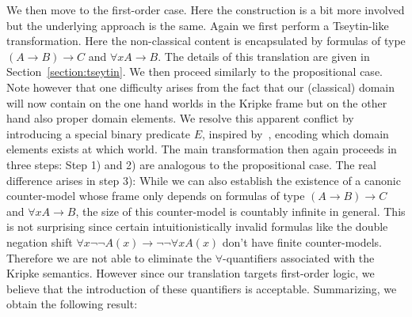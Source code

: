 \documentclass[runningheads]{llncs}
\begin{document}

We then move to the first-order case. Here the construction is a bit more involved but the underlying approach is the same.
Again we first perform a Tseytin-like transformation.
Here the non-classical content is encapsulated by formulas of type $(A\to B)\to C$ and $\forall xA\to B$.
The details of this translation are given in Section~\ref{section:tseytin}.
We then proceed similarly to the propositional case.
Note however that one difficulty arises from the fact that our (classical) domain will now contain on the one hand worlds in the Kripke frame but on the other hand also proper domain elements.
We resolve this apparent conflict by introducing a special binary predicate $E$, inspired by~\cite{iemhoff2010eskolemization}, encoding which domain elements exists at which world.
The main transformation then again proceeds in three steps:
Step 1) and 2) are analogous to the propositional case.
The real difference arises in step 3):
While we can also establish the existence of a canonic counter-model whose frame only depends on formulas of type $(A\to B)\to C$ and $\forall xA\to B$, the size of this counter-model is countably infinite in general.
This is not surprising since certain intuitionistically invalid formulas like the double negation shift $\forall x\neg\neg A(x)\to \neg\neg\forall x A(x)$ don't have finite counter-models.
Therefore we are not able to eliminate the $\forall$-quantifiers associated with the Kripke semantics.
However since our translation targets first-order logic, we believe that the introduction of these quantifiers is acceptable.
%
Summarizing, we obtain the following result:
\end{document}
